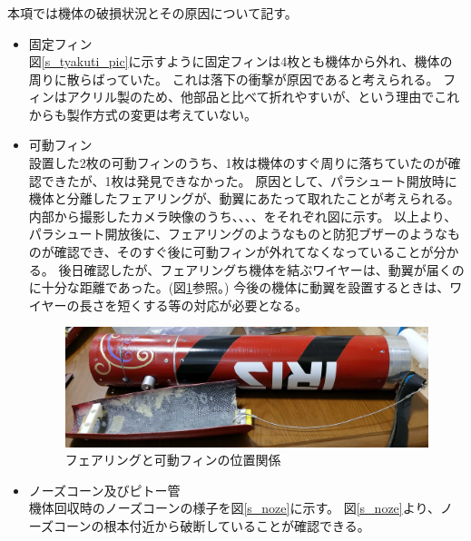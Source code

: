 \documentclass[a4paper,11pt,titlepage,uplatex]{jsarticle}
\begin{document}
\subsubsection{}
本項では機体の破損状況とその原因について記す。
\begin{itemize}
    \item 固定フィン\\
    図\ref{s_tyakuti_pic}に示すように固定フィンは4枚とも機体から外れ、機体の周りに散らばっていた。
    これは落下の衝撃が原因であると考えられる。
    フィンはアクリル製のため、他部品と比べて折れやすいが、という理由でこれからも製作方式の変更は考えていない。
    \\
    \item 可動フィン\\
    設置した2枚の可動フィンのうち、1枚は機体のすぐ周りに落ちていたのが確認できたが、1枚は発見できなかった。
    原因として、パラシュート開放時に機体と分離したフェアリングが、動翼にあたって取れたことが考えられる。
    内部から撮影したカメラ映像のうち、、、、をそれぞれ図に示す。
    以上より、パラシュート開放後に、フェアリングのようなものと防犯ブザーのようなものが確認でき、そのすぐ後に可動フィンが外れてなくなっていることが分かる。
    後日確認したが、フェアリングち機体を結ぶワイヤーは、動翼が届くのに十分な距離であった。(図\ref{s_fear}参照。)
    今後の機体に動翼を設置するときは、ワイヤーの長さを短くする等の対応が必要となる。
    
    \begin{figure}[H]
        \centering
        \includegraphics[scale = 0.12]{pic_str/s_fearring.jpg}
        \caption{フェアリングと可動フィンの位置関係}
        \label{s_fear}
    \end{figure}
    
    \item ノーズコーン及びピトー管\\
    機体回収時のノーズコーンの様子を図\ref{s_noze}に示す。
    図\ref{s_noze}より、ノーズコーンの根本付近から破断していることが確認できる。


\end{itemize}
\end{document}
